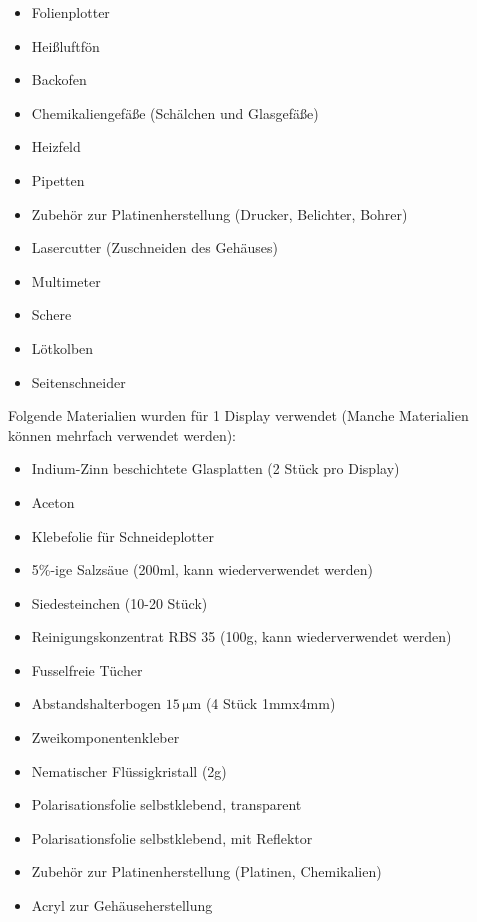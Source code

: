 \begin{itemize}
\item Folienplotter
\item Heißluftfön
\item Backofen
\item Chemikaliengefäße (Schälchen und Glasgefäße)
\item Heizfeld
\item Pipetten
\item Zubehör zur Platinenherstellung (Drucker, Belichter, Bohrer)
\item Lasercutter (Zuschneiden des Gehäuses)
\item Multimeter
\item Schere
\item Lötkolben
\item Seitenschneider\\
\end{itemize}



Folgende Materialien wurden für 1 Display verwendet (Manche Materialien können mehrfach verwendet werden):\\

\begin{itemize}
\item Indium-Zinn beschichtete Glasplatten (2 Stück pro Display)
\item Aceton
\item Klebefolie für Schneideplotter
\item 5\%-ige Salzsäue (200ml, kann wiederverwendet werden)
\item Siedesteinchen (10-20 Stück)
\item Reinigungskonzentrat RBS 35 (100g, kann wiederverwendet werden)
\item Fusselfreie Tücher
\item Abstandshalterbogen \(15\,\mathrm{\mu m}\) (4 Stück 1mmx4mm)
\item Zweikomponentenkleber
\item Nematischer Flüssigkristall (2g)
\item Polarisationsfolie selbstklebend, transparent
\item Polarisationsfolie selbstklebend, mit Reflektor
\item Zubehör zur Platinenherstellung (Platinen, Chemikalien)
\item Acryl zur Gehäuseherstellung
\end{itemize}